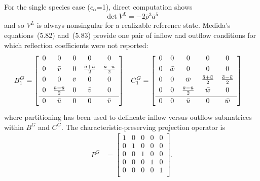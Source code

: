For the single species case ($c_\alpha$=1), direct computation shows
\[
  \det V^L = -2\bar{\rho}^3\bar{a}^5
\]
and so $V^L$ is always nonsingular for a realizable reference state.  Medida's
equations~(5.82) and~(5.83) provide one pair of inflow and outflow conditions
for which reflection coefficients were not reported:
%
\begin{align} \label{eq:dimeulerapproxmedidaopt1} B^G_1 &=
\left[\begin{array}{ccccc} 0 & 0                         & 0       & 0
& 0                         \\ \noalign{\smallskip} 0 & \bar{v}
& 0       & \frac{\bar{a} + \bar{u}}{2} & \frac{\bar{a}-\bar{u}}{2} \\
\noalign{\smallskip} 0 & 0                         & \bar{v} & 0
& 0                         \\ \noalign{\smallskip} 0 &
\frac{\bar{a}-\bar{u}}{2} & 0       & \bar{v}                     & 0
\\ \noalign{\smallskip} \hline 0 & \bar{u}                   & 0       & 0
& \bar{v}                   \\ \noalign{\smallskip} \end{array}\right] & C^G_1
&= \left[\begin{array}{ccccc} 0 & 0       & 0                         & 0
& 0                         \\ \noalign{\smallskip} 0 & \bar{w} & 0
& 0                         & 0                         \\
\noalign{\smallskip} 0 & 0       & \bar{w}                   &
\frac{\bar{a}+\bar{u}}{2} & \frac{\bar{a}-\bar{u}}{2} \\ \noalign{\smallskip}
0 & 0       & \frac{\bar{a}-\bar{u}}{2} & \bar{w}                   & 0
\\ \noalign{\smallskip} \hline 0 & 0       & \bar{u}                   & 0
& \bar{w}                   \\ \noalign{\smallskip} \end{array}\right]
\end{align}
%
where partitioning has been used to delineate inflow versus outflow submatrices
within $B^G$ and $C^G$.  
The characteristic-preserving projection operator is
%
\begin{align}
\label{eq:PGmedida}
  P^G
  &= \left[\begin{array}{ccccc}
    1 & 0 & 0 & 0 & 0 \\
    0 & 1 & 0 & 0 & 0 \\
    0 & 0 & 1 & 0 & 0 \\
    0 & 0 & 0 & 1 & 0 \\ \hline
    0 & 0 & 0 & 0 & 1 \\
  \end{array}\right]
.
\end{align}
